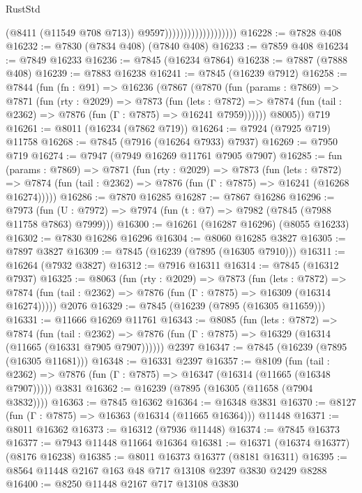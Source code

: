 \begin{lexlean}{RustStd}
\begin{coremodule}
                                          (@8411 (@11549 @708 @713))
                                          @9597)))))))))))))))))))
@16228 := @7828 @408
@16232 := @7830 (@7834 @408) (@7840 @408)
@16233 := @7859 @408
@16234 := @7849 @16233
@16236 := @7845 (@16234 @7864)
@16238 := @7887 (@7888 @408)
@16239 := @7883 @16238
@16241 := @7845 (@16239 @7912)
@16258 := @7844
    (fun (fn : @91) =>
    @16236
      (@7867
        (@7870
          (fun (params : @7869) =>
          @7871
            (fun (rty : @2029) =>
            @7873
              (fun (lets : @7872) =>
              @7874 (fun (tail : @2362) => @7876 (fun (Γ : @7875) => @16241 @7959))))))
        @8005))
    @719
@16261 := @8011 (@16234 (@7862 @719))
@16264 := @7924 (@7925 @719) @11758
@16268 := @7845 (@7916 (@16264 @7933) @7937)
@16269 := @7950 @719
@16274 := @7947 (@7949 @16269 @11761 @7905 @7907)
@16285 := fun (params : @7869) =>
  @7871
    (fun (rty : @2029) =>
    @7873
      (fun (lets : @7872) =>
      @7874 (fun (tail : @2362) => @7876 (fun (Γ : @7875) => @16241 (@16268 @16274)))))
@16286 := @7870 @16285
@16287 := @7867 @16286
@16296 := @7973
    (fun (U : @7972) => @7974 (fun (t : @7) => @7982 (@7845 (@7988 @11758 @7863) @7999)))
@16300 := @16261 (@16287 @16296) (@8055 @16233)
@16302 := @7830 @16286 @16296
@16304 := @8060 @16285 @3827
@16305 := @7897 @3827
@16309 := @7845 (@16239 (@7895 (@16305 @7910)))
@16311 := @16264 (@7932 @3827)
@16312 := @7916 @16311
@16314 := @7845 (@16312 @7937)
@16325 := @8063
    (fun (rty : @2029) =>
    @7873
      (fun (lets : @7872) =>
      @7874 (fun (tail : @2362) => @7876 (fun (Γ : @7875) => @16309 (@16314 @16274)))))
    @2076
@16329 := @7845 (@16239 (@7895 (@16305 @11659)))
@16331 := @11666 @16269 @11761
@16343 := @8085
    (fun (lets : @7872) =>
    @7874
      (fun (tail : @2362) =>
      @7876 (fun (Γ : @7875) => @16329 (@16314 (@11665 (@16331 @7905 @7907))))))
    @2397
@16347 := @7845 (@16239 (@7895 (@16305 @11681)))
@16348 := @16331 @2397
@16357 := @8109
    (fun (tail : @2362) => @7876 (fun (Γ : @7875) => @16347 (@16314 (@11665 (@16348 @7907)))))
    @3831
@16362 := @16239 (@7895 (@16305 (@11658 (@7904 @3832))))
@16363 := @7845 @16362
@16364 := @16348 @3831
@16370 := @8127 (fun (Γ : @7875) => @16363 (@16314 (@11665 @16364))) @11448
@16371 := @8011 @16362
@16373 := @16312 (@7936 @11448)
@16374 := @7845 @16373
@16377 := @7943 @11448 @11664 @16364
@16381 := @16371 (@16374 @16377) (@8176 @16238)
@16385 := @8011 @16373 @16377 (@8181 @16311)
@16395 := @8564 @11448 @2167 @163 @48 @717 @13108 @2397 @3830 @2429 @8288
@16400 := @8250 @11448 @2167 @717 @13108 @3830

\end{coremodule}
\end{lexlean}
